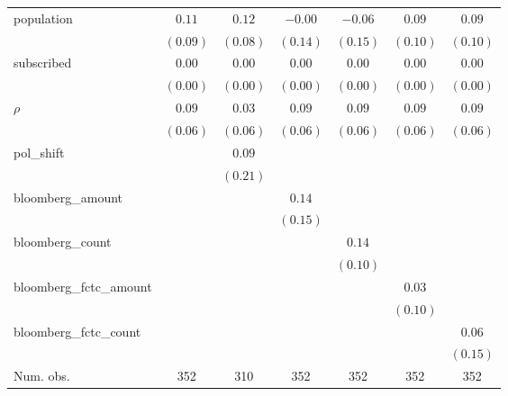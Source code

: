 \begin{table}[!h]
\begin{center}
\begin{tabular}{l c c c c c c }
population              & $0.11$       & $0.12$       & $-0.00$      & $-0.06$      & $0.09$       & $0.09$       \\
                        & $(0.09)$     & $(0.08)$     & $(0.14)$     & $(0.15)$     & $(0.10)$     & $(0.10)$     \\
subscribed              & $0.00$       & $0.00$       & $0.00$       & $0.00$       & $0.00$       & $0.00$       \\
                        & $(0.00)$     & $(0.00)$     & $(0.00)$     & $(0.00)$     & $(0.00)$     & $(0.00)$     \\
$\rho$                  & $0.09$       & $0.03$       & $0.09$       & $0.09$       & $0.09$       & $0.09$       \\
                        & $(0.06)$     & $(0.06)$     & $(0.06)$     & $(0.06)$     & $(0.06)$     & $(0.06)$     \\
pol\_shift              &              & $0.09$       &              &              &              &              \\
                        &              & $(0.21)$     &              &              &              &              \\
bloomberg\_amount       &              &              & $0.14$       &              &              &              \\
                        &              &              & $(0.15)$     &              &              &              \\
bloomberg\_count        &              &              &              & $0.14$       &              &              \\
                        &              &              &              & $(0.10)$     &              &              \\
bloomberg\_fctc\_amount &              &              &              &              & $0.03$       &              \\
                        &              &              &              &              & $(0.10)$     &              \\
bloomberg\_fctc\_count  &              &              &              &              &              & $0.06$       \\
                        &              &              &              &              &              & $(0.15)$     \\
\midrule
Num. obs.               & 352          & 310          & 352          & 352          & 352          & 352          \\

\end{tabular}
\end{center}
\end{table}
